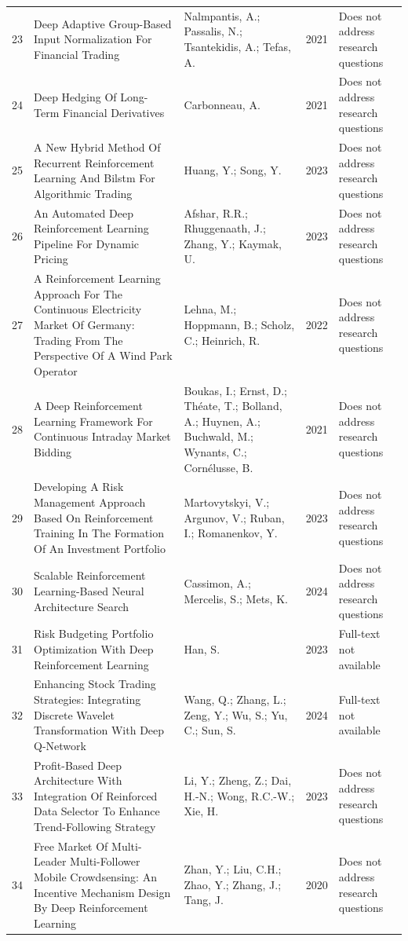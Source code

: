 \begin{small}
\begin{longtable}{r p{5cm} p{4cm} p{1cm} p{5cm}}
23 & Deep Adaptive Group-Based Input Normalization For Financial Trading & Nalmpantis, A.; Passalis, N.; Tsantekidis, A.; Tefas, A. & 2021 & Does not address research questions \\
24 & Deep Hedging Of Long-Term Financial Derivatives & Carbonneau, A. & 2021 & Does not address research questions \\
25 & A New Hybrid Method Of Recurrent Reinforcement Learning And Bilstm For Algorithmic Trading & Huang, Y.; Song, Y. & 2023 & Does not address research questions \\
26 & An Automated Deep Reinforcement Learning Pipeline For Dynamic Pricing & Afshar, R.R.; Rhuggenaath, J.; Zhang, Y.; Kaymak, U. & 2023 & Does not address research questions \\
27 & A Reinforcement Learning Approach For The Continuous Electricity Market Of Germany: Trading From The Perspective Of A Wind Park Operator & Lehna, M.; Hoppmann, B.; Scholz, C.; Heinrich, R. & 2022 & Does not address research questions \\
28 & A Deep Reinforcement Learning Framework For Continuous Intraday Market Bidding & Boukas, I.; Ernst, D.; Théate, T.; Bolland, A.; Huynen, A.; Buchwald, M.; Wynants, C.; Cornélusse, B. & 2021 & Does not address research questions \\
29 & Developing A Risk Management Approach Based On Reinforcement Training In The Formation Of An Investment Portfolio & Martovytskyi, V.; Argunov, V.; Ruban, I.; Romanenkov, Y. & 2023 & Does not address research questions \\
30 & Scalable Reinforcement Learning-Based Neural Architecture Search & Cassimon, A.; Mercelis, S.; Mets, K. & 2024 & Does not address research questions \\
31 & Risk Budgeting Portfolio Optimization With Deep Reinforcement Learning & Han, S. & 2023 & Full-text not available \\
32 & Enhancing Stock Trading Strategies: Integrating Discrete Wavelet Transformation With Deep Q-Network & Wang, Q.; Zhang, L.; Zeng, Y.; Wu, S.; Yu, C.; Sun, S. & 2024 & Full-text not available \\
33 & Profit-Based Deep Architecture With Integration Of Reinforced Data Selector To Enhance Trend-Following Strategy & Li, Y.; Zheng, Z.; Dai, H.-N.; Wong, R.C.-W.; Xie, H. & 2023 & Does not address research questions \\
34 & Free Market Of Multi-Leader Multi-Follower Mobile Crowdsensing: An Incentive Mechanism Design By Deep Reinforcement Learning & Zhan, Y.; Liu, C.H.; Zhao, Y.; Zhang, J.; Tang, J. & 2020 & Does not address research questions \\

\end{longtable}
\end{small}
